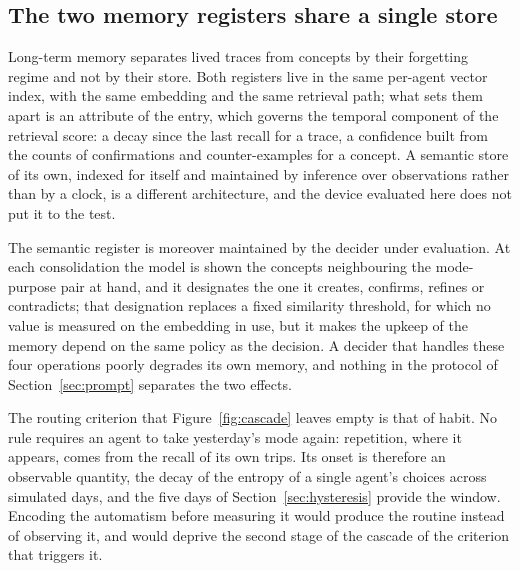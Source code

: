 \subsection{The two memory registers share a single store}
\label{sec:memory-stores}

Long-term memory separates lived traces from concepts by their forgetting regime and not by their store. Both registers live in the same per-agent vector index, with the same embedding and the same retrieval path; what sets them apart is an attribute of the entry, which governs the temporal component of the retrieval score: a decay since the last recall for a trace, a confidence built from the counts of confirmations and counter-examples for a concept. A semantic store of its own, indexed for itself and maintained by inference over observations rather than by a clock, is a different architecture, and the device evaluated here does not put it to the test.

The semantic register is moreover maintained by the decider under evaluation. At each consolidation the model is shown the concepts neighbouring the mode-purpose pair at hand, and it designates the one it creates, confirms, refines or contradicts; that designation replaces a fixed similarity threshold, for which no value is measured on the embedding in use, but it makes the upkeep of the memory depend on the same policy as the decision. A decider that handles these four operations poorly degrades its own memory, and nothing in the protocol of Section~\ref{sec:prompt} separates the two effects.

The routing criterion that Figure~\ref{fig:cascade} leaves empty is that of habit. No rule requires an agent to take yesterday's mode again: repetition, where it appears, comes from the recall of its own trips. Its onset is therefore an observable quantity, the decay of the entropy of a single agent's choices across simulated days, and the five days of Section~\ref{sec:hysteresis} provide the window. Encoding the automatism before measuring it would produce the routine instead of observing it, and would deprive the second stage of the cascade of the criterion that triggers it.
